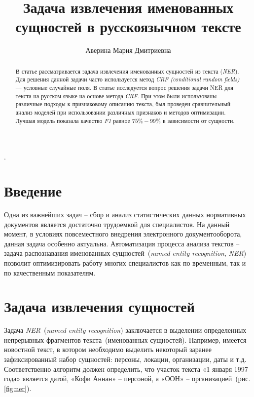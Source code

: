 \documentclass{csmathnotes}
\title{Задача извлечения именованных сущностей в русскоязычном тексте}
\author{Аверина Мария Дмитриевна}
\affiliation{Ярославский государственный университет им. П.\,Г. Демидова}
\begin{document}
\maketitle

\begin{abstract}
В статье рассматривается задача извлечения именованных сущностей из текста (\emph{NER}).
Для решения данной задачи часто используется метод \emph{CRF (conditional random fields)} --- условные случайные поля.
В статье исследуется вопрос решения задачи NER для текста на русском языке на основе метода \emph{CRF}.
При этом были использованы различные подходы к признаковому описанию текста,
был проведен сравнительный анализ моделей при использовании различных признаков и методов оптимизации.
Лучшая модель показала качество \emph{F1} равное $75\%-99\%$ в зависимости от сущности.
\end{abstract}

.

\section*{Введение}
Одна из важнейших задач – сбор и анализ статистических данных нормативных
документов является достаточно трудоемкой для специалистов. На данный момент, в условиях повсеместного внедрения электронного документооборота, данная задача особенно актуальна. Автоматизация процесса анализа текстов – задача распознавания именованных сущностей~(\emph{named entity recognition}, \emph{NER})~\cite{base} позволит оптимизировать работу многих специалистов как по временным, так и по качественным показателям.


\section*{Задача извлечения сущностей}

Задача \emph{NER}~(\emph{named entity recognition}) заключается в выделении определенных непрерывных фрагментов текста~(именованных сущностей).
Например, имеется новостной текст, в котором необходимо выделить некоторый заранее зафиксированный набор сущностей: персоны, локации, организации, даты и т.д.
Соответственно алгоритм должен определить, что участок текста «1 января 1997 года» является датой, «Кофи Аннан» – персоной, а «ООН» – организацией~(рис. \ref{fig:ner}).
\end{document}
